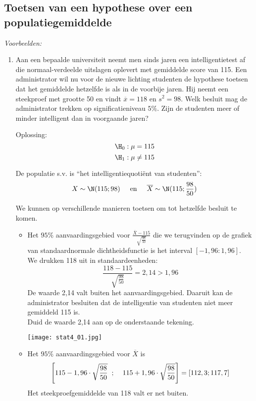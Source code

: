{\subsection{Toetsen van een hypothese over een populatiegemiddelde}

{\em Voorbeelden:}
\begin{enumerate}
 \item Aan een bepaalde universiteit neemt men sinds jaren een intelligentietest af die normaal-verdeelde uitslagen oplevert met gemiddelde score van 115. Een administrator wil nu voor de nieuwe lichting studenten de hypothese toetsen dat het gemiddelde hetzelfde is als in de voorbije jaren. Hij neemt een steekproef met grootte 50 en vindt $\overline{x}=118$ en $s^2=98$. Welk besluit mag de administrator trekken op significatieniveau $5\%$. Zijn de studenten meer of minder intelligent dan in voorgaande jaren?

{\sc Oplossing:} 
$$\H_0: \mu=115$$
$$\H_1:\mu\not= 115$$

De populatie s.v. is ``het intelligentiequoti\"ent  van studenten'':
$$X\sim \N(115;98)\hspace{0,5cm}\mbox{en}\hspace{0,5cm}\overline{X}\sim \N(115;\frac{98}{50})$$

We kunnen op verschillende manieren toetsen om tot hetzelfde besluit te komen.
\begin{itemize}
 \item Het $95\%$ aanvaardingsgebied voor $\frac{\overline{X}-115}{\sqrt{\frac{98}{50}}}$ die we terugvinden op de grafiek van standaardnormale dichtheidsfunctie  is het interval $[-1,96:1,96]$. \\
We drukken 118 uit in standaardeenheden:
$$\frac{118-115}{\sqrt{\frac{98}{50}}}=2,14>1,96$$
De waarde 2,14 valt buiten het aanvaardingsgebied. Daaruit kan de administrator besluiten dat de intelligentie van studenten niet meer gemiddeld 115 is. \\ Duid de waarde 2,14 aan op de onderstaande tekening. 

\texttt{[image: stat4\_01.jpg]}

\item Het $95\%$ aanvaardingsgebied voor $\overline{X}$ is
$$\left[ 115-1,96\cdot\sqrt{\frac{98}{50}}\hspace{0,2cm};\hspace{0,2cm}\hspace{0,2cm}115+1,96\cdot\sqrt{\frac{98}{50}}\right] =[112,3;117,7]$$
Het steekproefgemiddelde van 118 valt er net buiten. 


\end{itemize}
\end{enumerate}}
